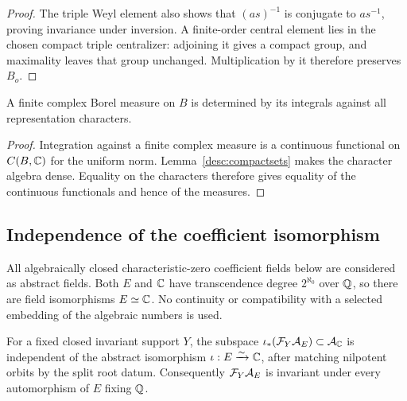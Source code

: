 \begin{proof}
The triple Weyl element also shows that $(as)^{-1}$ is conjugate to
$as^{-1}$, proving invariance under inversion. A finite-order central
element lies in the chosen compact triple centralizer: adjoining it
gives a compact group, and maximality leaves that group unchanged.
Multiplication by it therefore preserves $B_o$.
\end{proof}

\begin{corollary}\label{desc:unique-measure}
A finite complex Borel measure on $B$ is determined by its integrals
against all representation characters.
\end{corollary}

\begin{proof}
Integration against a finite complex measure is a continuous functional
on $C(B,\mathbb C)$ for the uniform norm. Lemma~\ref{desc:compactsets} makes the
character algebra dense. Equality on the characters therefore gives
equality of the continuous functionals and hence of the measures.
\end{proof}

\subsection{Independence of the coefficient isomorphism}

All algebraically closed characteristic-zero coefficient fields below
are considered as abstract fields. Both $E$ and $\mathbb C$ have transcendence
degree $2^{\aleph_0}$ over $\mathbb Q$, so there are field isomorphisms
$E\simeq\mathbb C$. No continuity or compatibility with a selected embedding of
the algebraic numbers is used.

\begin{proposition}\label{desc:coefficient-independence}
For a fixed closed invariant support $Y$, the subspace
$\iota_*(\mathcal F_Y\mathcal A_E)\subset\mathcal A_\mathbb C$ is independent of the abstract
isomorphism $\iota:E\xrightarrow{\sim}\mathbb C$, after matching nilpotent
orbits by the split root datum. Consequently $\mathcal F_Y\mathcal A_E$ is invariant
under every automorphism of $E$ fixing $\mathbb Q$.
\end{proposition}

